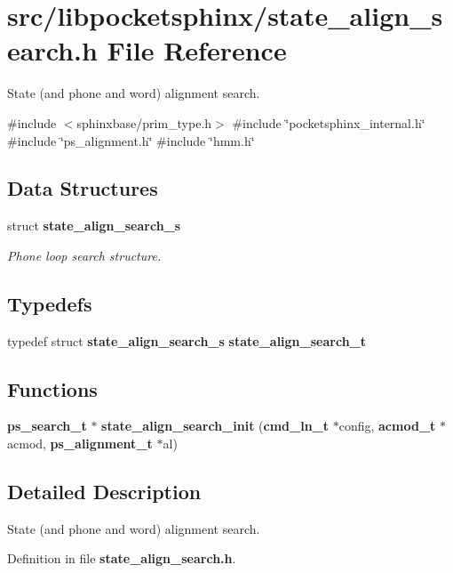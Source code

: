 \section{src/libpocketsphinx/state\-\_\-align\-\_\-search.h \-File \-Reference}
\label{state__align__search_8h}


\-State (and phone and word) alignment search.  


{\ttfamily \#include $<$sphinxbase/prim\-\_\-type.\-h$>$}\*
{\ttfamily \#include \char`\"{}pocketsphinx\-\_\-internal.\-h\char`\"{}}\*
{\ttfamily \#include \char`\"{}ps\-\_\-alignment.\-h\char`\"{}}\*
{\ttfamily \#include \char`\"{}hmm.\-h\char`\"{}}\*
\subsection*{\-Data \-Structures}
\begin{DoxyCompactItemize}
\item 
struct {\bf state\-\_\-align\-\_\-search\-\_\-s}
\begin{DoxyCompactList}\small\item\em \-Phone loop search structure. \end{DoxyCompactList}\end{DoxyCompactItemize}
\subsection*{\-Typedefs}
\begin{DoxyCompactItemize}
\item 
typedef struct {\bf state\-\_\-align\-\_\-search\-\_\-s} {\bfseries state\-\_\-align\-\_\-search\-\_\-t}\label{state__align__search_8h_a4559ae74ee038260ff66f432a7205aa8}

\end{DoxyCompactItemize}
\subsection*{\-Functions}
\begin{DoxyCompactItemize}
\item 
{\bf ps\-\_\-search\-\_\-t} $\ast$ {\bfseries state\-\_\-align\-\_\-search\-\_\-init} ({\bf cmd\-\_\-ln\-\_\-t} $\ast$config, {\bf acmod\-\_\-t} $\ast$acmod, {\bf ps\-\_\-alignment\-\_\-t} $\ast$al)\label{state__align__search_8h_a7263b71e3838f0689963439c8b695e15}

\end{DoxyCompactItemize}


\subsection{\-Detailed \-Description}
\-State (and phone and word) alignment search. 

\-Definition in file {\bf state\-\_\-align\-\_\-search.\-h}.

